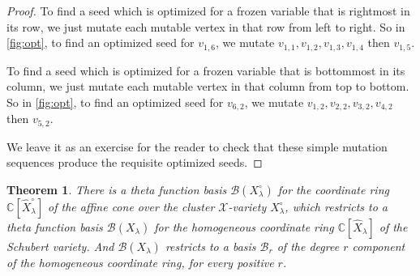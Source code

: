 \documentclass{amsart}
\newtheorem{theorem}[thm]{Theorem}
\theoremstyle{definition}
\numberwithin{equation}{section}
\newcommand{\C}{\mathbb{C}}
\begin{document}
\begin{proof}
To find a seed which is optimized for a frozen variable that is rightmost
in its row, we just mutate each mutable vertex in that row from left to right.
So in \cref{fig:opt}, to find an optimized seed for $v_{1,6}$,
we mutate $v_{1,1}, v_{1,2}, v_{1,3}, v_{1,4}$ then $v_{1,5}.$

To find a seed which is optimized for a frozen variable that is bottommost 
in its column, we just mutate each mutable vertex in that column 
from top to bottom.
So in \cref{fig:opt}, to find an optimized seed for $v_{6,2}$,
we mutate $v_{1,2}, v_{2,2}, v_{3,2}, v_{4,2}$ then $v_{5,2}.$

We leave it as an exercise for the reader to check that these simple mutation
sequences produce the requisite optimized seeds.
\end{proof}


\begin{theorem}\label{thm:theta}
There is a theta function basis $\mathcal{B}(X_{\lambda}^{\circ})$ for the coordinate ring
$\C[\widehat{X}_{\lambda}^{\circ}]$ of the affine
cone over the cluster $\mathcal{X}$-variety
$X_{\lambda}^{\circ}$, which restricts to a 
theta function basis
$\mathcal{B}(X_{\lambda})$ for the homogeneous
coordinate ring $\C[\widehat{X}_{\lambda}]$
of the Schubert variety.
And $\mathcal{B}(X_{\lambda})$ restricts to a basis
$\mathcal{B}_r$ of the degree $r$ component
of the homogeneous coordinate ring, for every positive
$r$.
\end{theorem}
\end{document}
